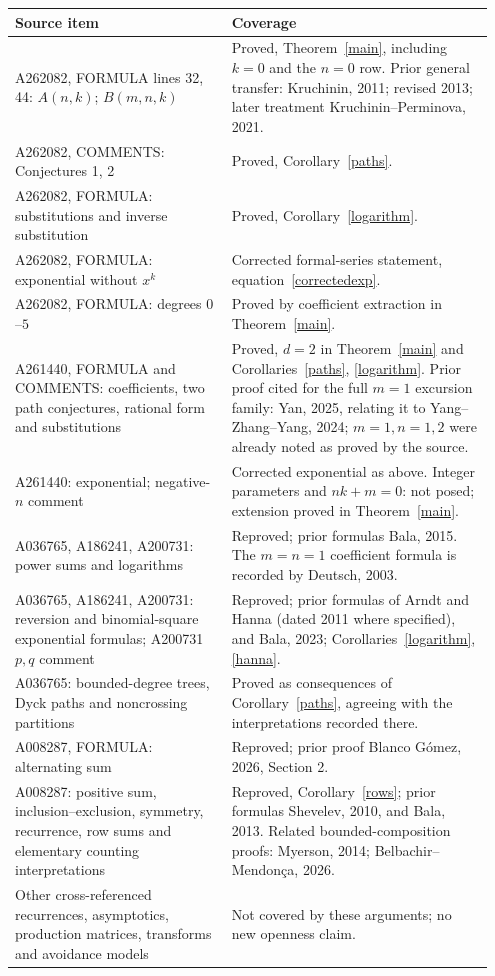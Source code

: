 \documentclass[11pt]{article}
\begin{document}
\begin{longtable}{@{}p{0.43\linewidth}p{0.52\linewidth}@{}}
\toprule Source item & Coverage\\\midrule\endhead
A262082, FORMULA lines 32, 44: $A(n,k)$; $B(m,n,k)$ & Proved, Theorem~\ref{main}, including $k=0$ and the $n=0$ row. Prior general transfer: Kruchinin, 2011; revised 2013; later treatment Kruchinin--Perminova, 2021.\\
A262082, COMMENTS: Conjectures 1, 2 & Proved, Corollary~\ref{paths}.\\
A262082, FORMULA: substitutions and inverse substitution & Proved, Corollary~\ref{logarithm}.\\
A262082, FORMULA: exponential without $x^k$ & Corrected formal-series statement, equation~\eqref{correctedexp}.\\
A262082, FORMULA: degrees $0$--$5$ & Proved by coefficient extraction in Theorem~\ref{main}.\\
A261440, FORMULA and COMMENTS: coefficients, two path conjectures, rational form and substitutions & Proved, $d=2$ in Theorem~\ref{main} and Corollaries~\ref{paths}, \ref{logarithm}. Prior proof cited for the full $m=1$ excursion family: Yan, 2025, relating it to Yang--Zhang--Yang, 2024; $m=1,n=1,2$ were already noted as proved by the source.\\
A261440: exponential; negative-$n$ comment & Corrected exponential as above. Integer parameters and $nk+m=0$: not posed; extension proved in Theorem~\ref{main}.\\
A036765, A186241, A200731: power sums and logarithms & Reproved; prior formulas Bala, 2015. The $m=n=1$ coefficient formula is recorded by Deutsch, 2003.\\
A036765, A186241, A200731: reversion and binomial-square exponential formulas; A200731 $p,q$ comment & Reproved; prior formulas of Arndt and Hanna (dated 2011 where specified), and Bala, 2023; Corollaries~\ref{logarithm}, \ref{hanna}.\\
A036765: bounded-degree trees, Dyck paths and noncrossing partitions & Proved as consequences of Corollary~\ref{paths}, agreeing with the interpretations recorded there.\\
A008287, FORMULA: alternating sum & Reproved; prior proof Blanco G\'omez, 2026, Section 2.\\
A008287: positive sum, inclusion--exclusion, symmetry, recurrence, row sums and elementary counting interpretations & Reproved, Corollary~\ref{rows}; prior formulas Shevelev, 2010, and Bala, 2013. Related bounded-composition proofs: Myerson, 2014; Belbachir--Mendon\c ca, 2026.\\
Other cross-referenced recurrences, asymptotics, production matrices, transforms and avoidance models & Not covered by these arguments; no new openness claim.\\
\bottomrule
\end{longtable}
\end{document}
